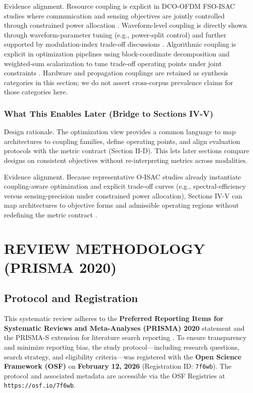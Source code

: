 \documentclass[lettersize,journal]{IEEEtran}
\begin{document}
Evidence alignment. Resource coupling is explicit in DCO-OFDM FSO-ISAC studies where communication and sensing objectives are jointly controlled through constrained power allocation \cite{O_ISAC_048,O_ISAC_023}.
Waveform-level coupling is directly shown through waveform-parameter tuning (e.g., power-split control) \cite{O_ISAC_075} and further supported by modulation-index trade-off discussions \cite{O_ISAC_001}.
Algorithmic coupling is explicit in optimization pipelines using block-coordinate decomposition and weighted-sum scalarization to tune trade-off operating points under joint constraints \cite{O_ISAC_023,O_ISAC_052}.
Hardware and propagation couplings are retained as synthesis categories in this section; we do not assert cross-corpus prevalence claims for those categories here.

\subsubsection{What This Enables Later (Bridge to Sections IV-V)}
Design rationale. The optimization view provides a common language to map architectures to coupling families, define operating points, and align evaluation protocols with the metric contract (Section II-D). This lets later sections compare designs on consistent objectives without re-interpreting metrics across modalities.

Evidence alignment. Because representative O-ISAC studies already instantiate coupling-aware optimization and explicit trade-off curves (e.g., spectral-efficiency versus sensing-precision under constrained power allocation), Sections IV-V can map architectures to objective forms and admissible operating regions without redefining the metric contract \cite{O_ISAC_048,O_ISAC_023,O_ISAC_052}.



\section{REVIEW METHODOLOGY (PRISMA 2020)}


\subsection{Protocol and Registration}
This systematic review adheres to the \textbf{Preferred Reporting Items for Systematic Reviews and Meta-Analyses (PRISMA) 2020} statement \cite{PRISMA2020} and the PRISMA-S extension for literature search reporting \cite{PRISMAS2021}. To ensure transparency and minimize reporting bias, the study protocol---including research questions, search strategy, and eligibility criteria---was registered with the \textbf{Open Science Framework (OSF)} on \textbf{February 12, 2026} (Registration ID: \texttt{7f6wb}). The protocol and associated metadata are accessible via the OSF Registries at \texttt{https://osf.io/7f6wb}.
\end{document}
